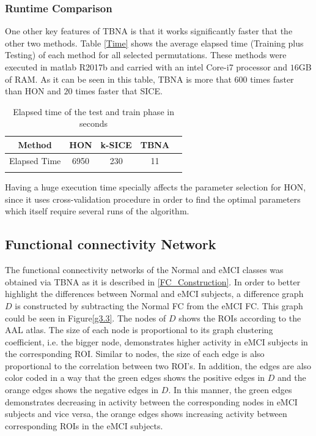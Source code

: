 \documentclass[journal]{IEEEtran}
\begin{document}
	\subsubsection{Runtime Comparison}
	One other key features of TBNA is that it works significantly faster that the other two methods. Table \eqref{Time} shows the average elapsed time (Training plus Testing) of each method for all selected permutations. These methods were executed in matlab R2017b and carried with an intel Core-i7 processor and $16$GB of RAM. As it can be seen in this table, TBNA is more that $600$ times faster than HON and $20$ times faster that SICE.   
	\begin{table}
		\begin{center}
			\caption{Elapsed time of the test and train phase in seconds}
			\begin{tabular}{@{}c*{4}{c}}
				\hline\hline
				Method& HON & k-SICE& TBNA  
				\\
				\hline
				Elapsed Time  &6950& 230 & 11 
				\\
				\hline\hline
				\label{Time}
			\end{tabular}
		\end{center}
	\end{table}
	Having a huge execution time specially affects the parameter selection for HON, since it uses cross-validation procedure in order to find the optimal parameters which itself require several  runs of the algorithm. 
	
	
	
	
	\subsection{Functional connectivity Network}
	The functional connectivity networks of the Normal and eMCI classes was obtained via TBNA as it is described in \eqref{FC_Construction}.
	In order to better highlight the differences between Normal and eMCI subjects, a difference graph $D$ is constructed by subtracting the Normal FC from the eMCI FC. This graph could be seen in Figure\eqref{g3.3}. 
	The nodes of $D$ shows the ROIs according to the AAL atlas. The size of each node is proportional to its graph clustering coefficient, i.e. the bigger node, demonstrates higher activity in eMCI subjects in the corresponding ROI. 
	Similar to nodes, the size of each edge is also proportional to the correlation between two ROI's. In addition, the edges are also color coded in a way that the green edges shows the positive edges in $D$ and the orange edges shows the negative edges in $D$. In this manner, the green edges demonstrates decreasing in activity between the corresponding nodes in eMCI subjects and vice versa, the orange edges shows increasing activity between corresponding ROIs in the eMCI subjects.   
	
\end{document}
